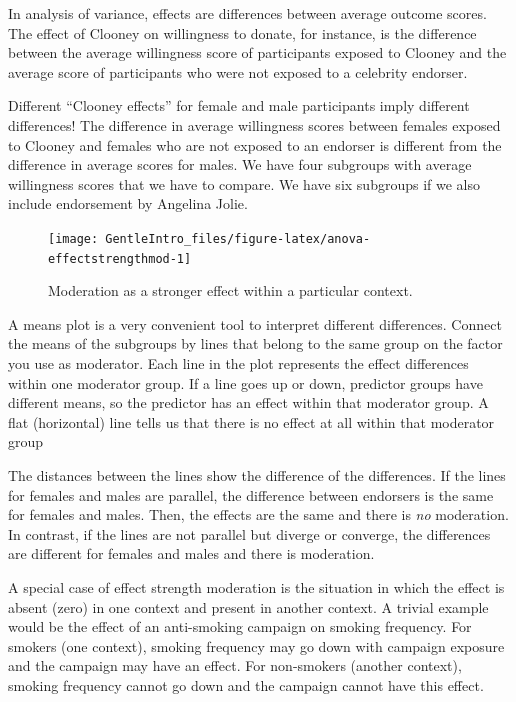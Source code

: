 \documentclass[a4paper]{book}
\theoremstyle{definition}
\theoremstyle{definition}
\theoremstyle{definition}
\theoremstyle{remark}
\begin{document}
In analysis of variance, effects are differences between average outcome
scores. The effect of Clooney on willingness to donate, for instance, is
the difference between the average willingness score of participants
exposed to Clooney and the average score of participants who were not
exposed to a celebrity endorser.

Different ``Clooney effects'' for female and male participants imply
different differences! The difference in average willingness scores
between females exposed to Clooney and females who are not exposed to an
endorser is different from the difference in average scores for males.
We have four subgroups with average willingness scores that we have to
compare. We have six subgroups if we also include endorsement by
Angelina Jolie.

\begin{figure}[H]
\texttt{[image: GentleIntro\_files/figure-latex/anova-effectstrengthmod-1]} \caption{Moderation as a stronger effect within a particular context.}\label{fig:anova-effectstrengthmod}
\end{figure}

A means plot is a very convenient tool to interpret different
differences. Connect the means of the subgroups by lines that belong to
the same group on the factor you use as moderator. Each line in the plot
represents the effect differences within one moderator group. If a line
goes up or down, predictor groups have different means, so the predictor
has an effect within that moderator group. A flat (horizontal) line
tells us that there is no effect at all within that moderator group

The distances between the lines show the difference of the differences.
If the lines for females and males are parallel, the difference between
endorsers is the same for females and males. Then, the effects are the
same and there is \emph{no} moderation. In contrast, if the lines are
not parallel but diverge or converge, the differences are different for
females and males and there is moderation.

A special case of effect strength moderation is the situation in which
the effect is absent (zero) in one context and present in another
context. A trivial example would be the effect of an anti-smoking
campaign on smoking frequency. For smokers (one context), smoking
frequency may go down with campaign exposure and the campaign may have
an effect. For non-smokers (another context), smoking frequency cannot
go down and the campaign cannot have this effect.
\end{document}
